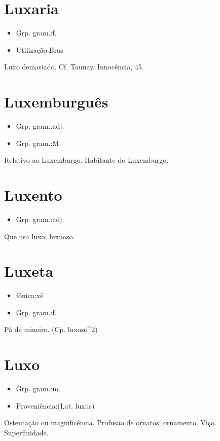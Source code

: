\section{Luxaria}
\begin{itemize}
\item {Grp. gram.:f.}
\end{itemize}
\begin{itemize}
\item {Utilização:Bras}
\end{itemize}
Luxo demasiado. Cf. Taunay, \textunderscore Innocência\textunderscore , 45.
\section{Luxemburguês}
\begin{itemize}
\item {Grp. gram.:adj.}
\end{itemize}
\begin{itemize}
\item {Grp. gram.:M.}
\end{itemize}
Relativo ao Luxemburgo.
Habitante do Luxemburgo.
\section{Luxento}
\begin{itemize}
\item {Grp. gram.:adj.}
\end{itemize}
Que usa luxo; luxuoso.
\section{Luxeta}
\begin{itemize}
\item {fónica:xê}
\end{itemize}
\begin{itemize}
\item {Grp. gram.:f.}
\end{itemize}
Pá de mineiro.
(Cp. \textunderscore luxoso\textunderscore ^2)
\section{Luxo}
\begin{itemize}
\item {Grp. gram.:m.}
\end{itemize}
\begin{itemize}
\item {Proveniência:(Lat. \textunderscore luxus\textunderscore )}
\end{itemize}
Ostentação ou magnificência.
Profusão de ornatos; ornamento.
Viço.
Superfluidade.
